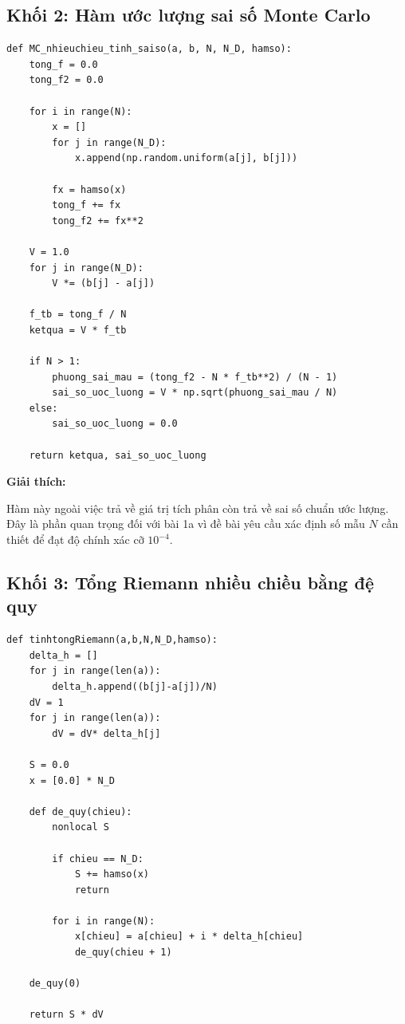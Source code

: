 \documentclass{article}
\begin{document}
\subsection{Khối 2: Hàm ước lượng sai số Monte Carlo}
\begin{lstlisting}[style=mypython,caption={Hàm Monte Carlo có kèm ước lượng sai số}]
def MC_nhieuchieu_tinh_saiso(a, b, N, N_D, hamso):
    tong_f = 0.0
    tong_f2 = 0.0

    for i in range(N):
        x = []
        for j in range(N_D):
            x.append(np.random.uniform(a[j], b[j]))

        fx = hamso(x)
        tong_f += fx
        tong_f2 += fx**2

    V = 1.0
    for j in range(N_D):
        V *= (b[j] - a[j])

    f_tb = tong_f / N
    ketqua = V * f_tb

    if N > 1:
        phuong_sai_mau = (tong_f2 - N * f_tb**2) / (N - 1)
        sai_so_uoc_luong = V * np.sqrt(phuong_sai_mau / N)
    else:
        sai_so_uoc_luong = 0.0

    return ketqua, sai_so_uoc_luong
\end{lstlisting}

\textbf{Giải thích:}

Hàm này ngoài việc trả về giá trị tích phân còn trả về sai số chuẩn ước lượng. Đây là phần quan trọng đối với bài 1a vì đề bài yêu cầu xác định số mẫu $N$ cần thiết để đạt độ chính xác cỡ $10^{-4}$.

\subsection{Khối 3: Tổng Riemann nhiều chiều bằng đệ quy}
\begin{lstlisting}[style=mypython,caption={Hàm tổng Riemann nhiều chiều}]
def tinhtongRiemann(a,b,N,N_D,hamso):
    delta_h = []
    for j in range(len(a)):
        delta_h.append((b[j]-a[j])/N)
    dV = 1
    for j in range(len(a)):
        dV = dV* delta_h[j]
    
    S = 0.0
    x = [0.0] * N_D

    def de_quy(chieu):
        nonlocal S

        if chieu == N_D:
            S += hamso(x)
            return

        for i in range(N):
            x[chieu] = a[chieu] + i * delta_h[chieu]
            de_quy(chieu + 1)

    de_quy(0)

    return S * dV
\end{lstlisting}
\end{document}

